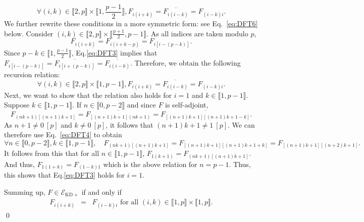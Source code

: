 \documentclass[a4paper, notitlepage, 11pt]{article}
\numberwithin{equation}{section}
\newcommand{\EcalKDC}{{\mathcal E}_{\mathrm{KD+}}}
\newcommand{\IntEnt}[2]{\llbracket #1 , #2 \rrbracket}
\begin{document}
\begin{equation}\label{eq:DFT3} \forall(i,k)\in\IntEnt{2}{p}\times\IntEnt{1}{\frac{p-1}{2}}, F_{i (i+k)} = \overline{F_{i (i-k)}}=F_{(i-k)i}.
\end{equation}
 We further rewrite these conditions in a more symmetric form: see Eq.~\eqref{eq:DFT6} below. 
Consider $(i,k)\in\IntEnt{2}{p}\times\IntEnt{\frac{p+1}{2}}{p-1}$. As all  indices are taken modulo $p$,  
$$
F_{i (i+k)} = F_{i (i+k-p)} = F_{i [i-(p-k)]}.
$$
Since $p-k\in\IntEnt{1}{\frac{p-1}{2}}$, Eq.\eqref{eq:DFT3} implies that $F_{i [i-(p-k)]}=\overline{F_{i [i+(p-k)]}} = \overline{F_{i (i-k)}}$. Therefore, we obtain the following recursion relation: 
\begin{equation}\label{eq:DFT4} 
\forall (i,k)\in\IntEnt{2}{p}\times\IntEnt{1}{p-1}, F_{i (i+k)} = \overline{F_{i (i-k)}}=F_{(i-k)i}.
\end{equation}
Next, we want to show that the relation also holds for $i=1$ and $k\in\IntEnt{1}{p-1}$. Suppose $k\in\IntEnt{1}{p-1}$. If $n\in\IntEnt{0}{p-2}$ and since $F$ is self-adjoint,
\[
F_{(nk+1) [(n+1)k+1]} = \overline{F_{[(n+1)k+1](nk+1)}} = \overline{F_{[(n+1)k+1][(n+1)k+1 -k]}}.
\]
As $n+1\neq 0~[p]$ and $k\neq 0~[p]$, it follows that $(n+1)k+1\neq 1~[p]$. We can therefore use Eq.~\eqref{eq:DFT4} to obtain
\[
\forall n\in\IntEnt{0}{p-2}, k\in\IntEnt{1}{p-1},\quad F_{(nk+1) [(n+1)k+1]} = F_{[(n+1)k+1][(n+1)k+1+k]} = F_{[(n+1)k+1][(n+2)k+1]}.
\]
It follows from this that for all $n\in\IntEnt{1}{p-1}$,
$F_{1(k+1)} = F_{(nk+1)[(n+1)k+1]}$. And thus, $F_{1(1+k)} = F_{(1-k)1} $ which is the above relation  for $n=p-1$. Thus, this shows that Eq.\eqref{eq:DFT3} holds for $i=1$.


Summing up, $F\in\EcalKDC$ if and only if 
\begin{equation}\label{eq:DFT6}
\begin{array}{rcl}
F_{i (i+k)}&=&F_{(i-k)i}\text{ for all }(i,k)\in\IntEnt{1}{p}\times\IntEnt{1}{p}.
\end{array}
\end{equation}
\qed
\\
\end{document}
